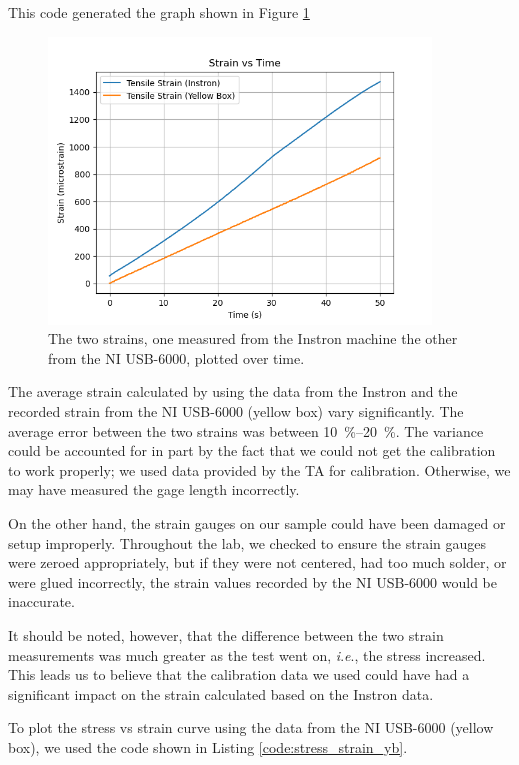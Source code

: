 \documentclass[12 pt]{report}
\newcommand{\ie}{\textit{i}.\textit{e}., }
\begin{document}
\begin{parlist}
	This code generated the graph shown in Figure \ref{fig:strains}
	
	\begin{figure}[htbp]
		\centering
		\includegraphics[width=4in]{images/graphs/Strain vs Time}
		\caption{The two strains, one measured from the Instron machine the other from the NI USB-6000, plotted over time.}
		\label{fig:strains}
	\end{figure}
	
	\item The average strain calculated by using the data from the Instron and the recorded strain from the NI USB-6000 (yellow box) vary significantly. The average error between the two strains was between \qtyrange{10}{20}{\%}. The variance could be accounted for in part by the fact that we could not get the calibration to work properly; we used data provided by the TA for calibration. Otherwise, we may have measured the gage length incorrectly.
	
	On the other hand, the strain gauges on our sample could have been damaged or setup improperly. Throughout the lab, we checked to ensure the strain gauges were zeroed appropriately, but if they were not centered, had too much solder, or were glued incorrectly, the strain values recorded by the NI USB-6000 would be inaccurate.
	
	It should be noted, however, that the difference between the two strain measurements was much greater as the test went on, \ie the stress increased. This leads us to believe that the calibration data we used could have had a significant impact on the strain calculated based on the Instron data.
	
	\item To plot the stress vs strain curve using the data from the NI USB-6000 (yellow box), we used the code shown in Listing \ref{code:stress_strain_yb}.
	

\end{parlist}
\end{document}
